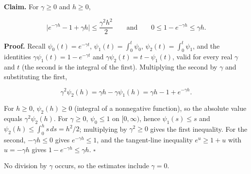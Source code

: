 \documentclass[11pt,a4paper]{article}
\begin{document}
\textbf{Claim.} For \(\gamma\ge0\) and \(h\ge0\),


\[\bigl|e^{-\gamma h}-1+\gamma h\bigr|\le\frac{\gamma^2h^2}2\qquad\text{and}\qquad0\le1-e^{-\gamma h}\le\gamma h .\]


\textbf{Proof.} Recall \(\psi_0(t)=e^{-\gamma t}\), \(\psi_1(t)=\int_0^t\psi_0\), \(\psi_2(t)=\int_0^t\psi_1\), and the identities \(\gamma\psi_1(t)=1-e^{-\gamma t}\) and \(\gamma\psi_2(t)=t-\psi_1(t)\), valid for every real \(\gamma\) and \(t\) (the second is the integral of the first). Multiplying the second by \(\gamma\) and substituting the first,


\[\gamma^2\psi_2(h)=\gamma h-\gamma\psi_1(h)=\gamma h-1+e^{-\gamma h}.\]


For \(h\ge0\), \(\psi_2(h)\ge0\) (integral of a nonnegative function), so the absolute value equals \(\gamma^2\psi_2(h)\). For \(\gamma\ge0\), \(\psi_0\le1\) on \([0,\infty)\), hence \(\psi_1(s)\le s\) and \(\psi_2(h)\le\int_0^hs\,ds=h^2/2\); multiplying by \(\gamma^2\ge0\) gives the first inequality. For the second, \(-\gamma h\le0\) gives \(e^{-\gamma h}\le1\), and the tangent-line inequality \(e^u\ge1+u\) with \(u=-\gamma h\) gives \(1-e^{-\gamma h}\le\gamma h\). \(\square\)




No division by \(\gamma\) occurs, so the estimates include \(\gamma=0\).
\end{document}
